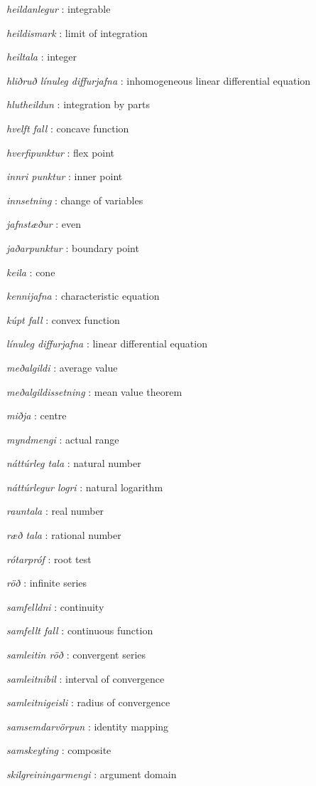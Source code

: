 \documentclass[b5paper,11pt,icelandic]{sphinxmanual}
\begin{document}
\emph{heildanlegur} : integrable


\emph{heildismark} : limit of integration


\emph{heiltala} : integer

\emph{hliðruð línuleg diffurjafna} : inhomogeneous linear differential equation

\emph{hlutheildun} : integration by parts

\emph{hvelft fall} : concave function


\emph{hverfipunktur} : flex point

\emph{innri punktur} : inner point

\emph{innsetning} : change of variables

\emph{jafnstæður} : even


\emph{jaðarpunktur} : boundary point

\emph{keila} : cone


\emph{kennijafna} : characteristic equation


\emph{kúpt fall} : convex function


\emph{línuleg diffurjafna} : linear differential equation


\emph{meðalgildi} : average value

\emph{meðalgildissetning} : mean value theorem


\emph{miðja} : centre

\emph{myndmengi} : actual range

\emph{náttúrleg tala} : natural number


\emph{náttúrlegur logri} : natural logarithm


\emph{rauntala} : real number


\emph{ræð tala} : rational number


\emph{rótarpróf} : root test


\emph{röð} : infinite series

\emph{samfelldni} : continuity


\emph{samfellt fall} : continuous function


\emph{samleitin röð} : convergent series


\emph{samleitnibil} : interval of convergence


\emph{samleitnigeisli} : radius of convergence


\emph{samsemdarvörpun} : identity mapping


\emph{samskeyting} : composite


\emph{skilgreiningarmengi} : argument domain
\end{document}
